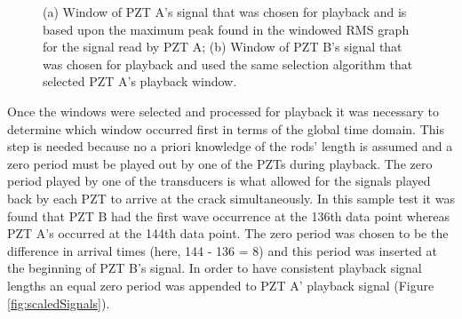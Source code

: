 \begin{figure}
\begin{subfigmatrix}{2}
\end{subfigmatrix}

  \caption[all]
  { \label{fig:chosenSignals}
(a) Window of PZT A's signal that was chosen for playback and is based upon the maximum peak found in the windowed RMS graph for the signal read by PZT A;
(b) Window of PZT B's signal that was chosen for playback and used the same selection algorithm that selected PZT A's playback window.
}
\end{figure}

Once the windows were selected and processed for playback it was necessary to determine which window occurred first in terms of the global time domain. This step is needed because no a priori knowledge of the rods' length is assumed and a zero period must be played out by one of the PZTs during playback. The zero period played by one of the transducers is what allowed for the signals played back by each PZT to arrive at the crack simultaneously. In this sample test it was found that PZT B had the first wave occurrence at the 136th data point whereas PZT A's occurred at the 144th data point.  The zero period was chosen to be the difference in arrival times (here, 144 - 136 = 8) and this period was inserted at the beginning of PZT B's signal. In order to have consistent playback signal lengths an equal zero period was appended to PZT A' playback signal (Figure \ref{fig:scaledSignals}).

